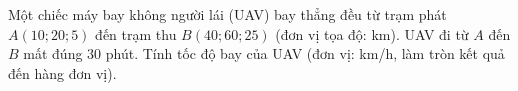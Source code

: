 \begin{ex}
Một chiếc máy bay không người lái (UAV) bay thẳng đều từ trạm phát $A(10;20;5)$ đến trạm thu $B(40;60;25)$ (đơn vị tọa độ: km). UAV đi từ $A$ đến $B$ mất đúng $30$ phút. Tính tốc độ bay của UAV (đơn vị: km/h, làm tròn kết quả đến hàng đơn vị).
\end{ex}

